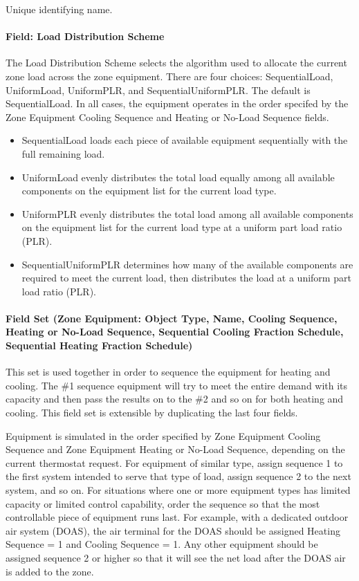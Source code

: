 Unique identifying name.

\paragraph{Field: Load Distribution Scheme}\label{field-load-distribution-scheme-000}

The Load Distribution Scheme selects the algorithm used to allocate the current zone load across the zone equipment. There are four choices: SequentialLoad, UniformLoad, UniformPLR, and SequentialUniformPLR. The default is SequentialLoad. In all cases, the equipment operates in the order specifed by the Zone Equipment Cooling Sequence and Heating or No-Load Sequence fields.

\begin{itemize}
\item
  SequentialLoad loads each piece of available equipment sequentially with the full remaining load.
\item
  UniformLoad evenly distributes the total load equally among all available components on the equipment list for the current load type.
\item
  UniformPLR evenly distributes the total load among all available components on the equipment list for the current load type at a uniform part load ratio (PLR).
\item
  SequentialUniformPLR determines how many of the available components are required to meet the current load, then distributes the load at a uniform part load ratio (PLR).
\end{itemize}
\paragraph{Field Set (Zone Equipment: Object Type, Name, Cooling Sequence, Heating or No-Load Sequence, Sequential Cooling Fraction Schedule, Sequential Heating Fraction Schedule)}\label{field-set-zone-equipment-object-type-name-cooling-sequence-heating-or-no-load-sequence}

This set is used together in order to sequence the equipment for heating and cooling. The \#1 sequence equipment will try to meet the entire demand with its capacity and then pass the results on to the \#2 and so on for both heating and cooling. This field set is extensible by duplicating the last four fields.

Equipment is simulated in the order specified by Zone Equipment Cooling Sequence and Zone Equipment Heating or No-Load Sequence, depending on the current thermostat request. For equipment of similar type, assign sequence 1 to the first system intended to serve that type of load, assign sequence 2 to the next system, and so on. For situations where one or more equipment types has limited capacity or limited control capability, order the sequence so that the most controllable piece of equipment runs last. For example, with a dedicated outdoor air system (DOAS), the air terminal for the DOAS should be assigned Heating Sequence = 1 and Cooling Sequence = 1. Any other equipment should be assigned sequence 2 or higher so that it will see the net load after the DOAS air is added to the zone.

